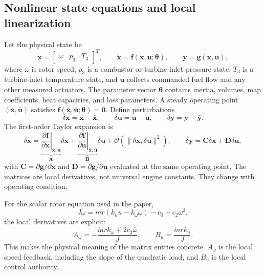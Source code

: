 \documentclass[10pt,journal]{IEEEtran}
\begin{document}
\subsection{Nonlinear state equations and local linearization}
Let the physical state be
\begin{equation}
  \mathbf{x}=\begin{bmatrix}\omega & p_3 & T_3\end{bmatrix}^{T},
  \qquad
  \dot{\mathbf{x}}=\mathbf{f}(\mathbf{x},\mathbf{u};\boldsymbol{\theta}),
  \qquad
  \mathbf{y}=\mathbf{g}(\mathbf{x},\mathbf{u}),
  \label{eq:app_nonlinear_state}
\end{equation}
where $\omega$ is rotor speed, $p_3$ is a combustor or turbine-inlet pressure state, $T_3$ is a turbine-inlet temperature state, and $\mathbf{u}$ collects commanded fuel flow and any other measured actuators. The parameter vector $\boldsymbol{\theta}$ contains inertia, volumes, map coefficients, heat capacities, and loss parameters. A steady operating point $(\bar{\mathbf{x}},\bar{\mathbf{u}})$ satisfies $\mathbf{f}(\bar{\mathbf{x}},\bar{\mathbf{u}};\boldsymbol{\theta})=\mathbf{0}$. Define perturbations
\begin{equation}
  \delta\mathbf{x}=\mathbf{x}-\bar{\mathbf{x}},
  \qquad
  \delta\mathbf{u}=\mathbf{u}-\bar{\mathbf{u}},
  \qquad
  \delta\mathbf{y}=\mathbf{y}-\bar{\mathbf{y}}.
\end{equation}
The first-order Taylor expansion is
\begin{equation}
  \delta\dot{\mathbf{x}}
  =\underbrace{\left.\frac{\partial\mathbf{f}}{\partial\mathbf{x}}\right|_{\bar{\mathbf{x}},\bar{\mathbf{u}}}}_{\mathbf{A}}
   \delta\mathbf{x}
  +\underbrace{\left.\frac{\partial\mathbf{f}}{\partial\mathbf{u}}\right|_{\bar{\mathbf{x}},\bar{\mathbf{u}}}}_{\mathbf{B}}
   \delta\mathbf{u}
  +\mathcal{O}\!\left(\|\delta\mathbf{x},\delta\mathbf{u}\|^2\right),
  \qquad
  \delta\mathbf{y}=\mathbf{C}\delta\mathbf{x}+\mathbf{D}\delta\mathbf{u},
  \label{eq:app_linearization}
\end{equation}
with $\mathbf{C}=\partial\mathbf{g}/\partial\mathbf{x}$ and $\mathbf{D}=\partial\mathbf{g}/\partial\mathbf{u}$ evaluated at the same operating point. The matrices are local derivatives, not universal engine constants. They change with operating condition.

For the scalar rotor equation used in the paper,
\begin{equation}
  J\dot{\omega}=\dot m r(k_u u-k_\omega\omega)-c_0-c_2\omega^2,
\end{equation}
the local derivatives are explicit:
\begin{equation}
  A_\omega=-\frac{\dot m r k_\omega+2c_2\bar\omega}{J},
  \qquad
  B_u=\frac{\dot m r k_u}{J}.
  \label{eq:app_scalar_jacobian}
\end{equation}
This makes the physical meaning of the matrix entries concrete. $A_\omega$ is the local speed feedback, including the slope of the quadratic load, and $B_u$ is the local control authority.
\end{document}
